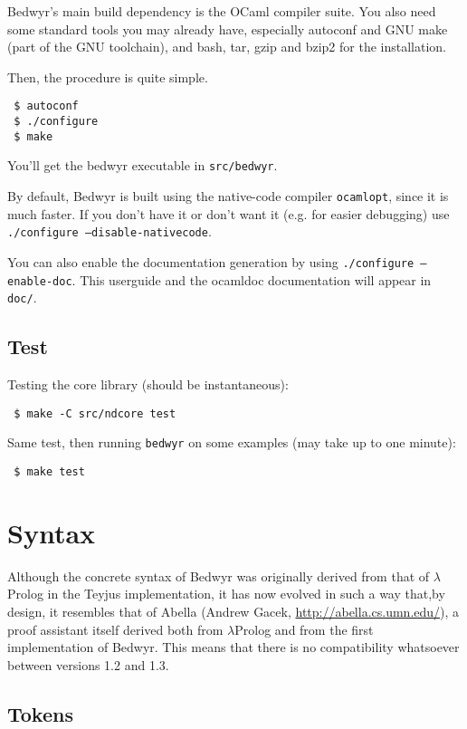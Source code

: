 \documentclass{article}
\newcommand{\lp}{$\lambda$Prolog}
\begin{document}
Bedwyr's main build dependency is the OCaml compiler suite.
You also need some standard tools you may already have, especially
autoconf and GNU make (part of the GNU toolchain),
and bash, tar, gzip and bzip2 for the installation.

Then, the procedure is quite simple.

\begin{verbatim}
 $ autoconf
 $ ./configure
 $ make
\end{verbatim}

You'll get the bedwyr executable in \texttt{src/bedwyr}.

By default, Bedwyr is built using the native-code compiler \texttt{ocamlopt},
since it is much faster. If you don't have it or don't want it (e.g.
for easier debugging) use \texttt{./configure --disable-nativecode}.

You can also enable the documentation generation by using
\texttt{./configure --enable-doc}. This userguide and the ocamldoc
documentation will appear in \texttt{doc/}.

\subsection{Test}

Testing the core library (should be instantaneous):
\begin{verbatim}
 $ make -C src/ndcore test
\end{verbatim}
Same test, then running {\tt bedwyr} on some examples (may take up to
one minute):
\begin{verbatim}
 $ make test
\end{verbatim}


\section{Syntax}

Although the concrete syntax of Bedwyr was originally derived from that
of \lp{} in the Teyjus implementation\cite{nadathur99cade}, it has
now evolved in such a way that,by design, it resembles that of Abella
(Andrew Gacek,
\urldef{\thisurl}\url{http://abella.cs.umn.edu/}\ahrefurl{\thisurl}), a
proof assistant itself derived both from \lp{} and from the first
implementation of Bedwyr. This means that there is no compatibility
whatsoever between versions 1.2 and 1.3.

\subsection{Tokens}
\end{document}
